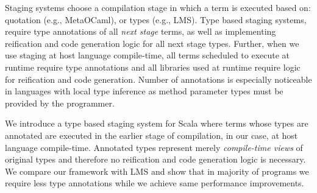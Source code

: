 Staging systems choose a compilation stage in which a term is executed based on: quotation (e.g., MetaOCaml), or types (e.g., LMS). Type based staging systems, require type annotations of all \emph{next stage} terms, as well as implementing reification and code generation logic for all next stage types. Further, when we use staging at host language compile-time, all terms scheduled to execute at runtime require type annotations and all libraries used at runtime require logic for reification and code generation. Number of annotations is especially noticeable in languages with local type inference as method parameter types must be provided by the programmer.

We introduce a type based staging system for Scala where terms whose types are annotated are executed in the earlier stage of compilation, in our case, at host language compile-time. Annotated types represent merely \emph{compile-time views} of original types and therefore no reification and code generation logic is necessary. We compare our framework with LMS and show that in majority of programs we require less type annotations while we achieve same performance improvements.
